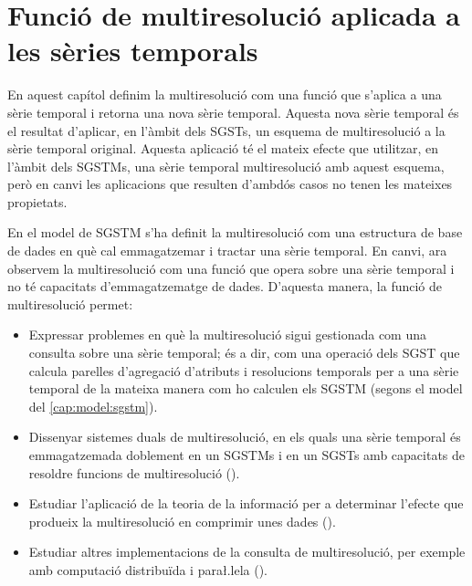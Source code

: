 
\chapter{Funció de multiresolució aplicada a les sèries temporals}
\label{cap:funciomultiresolucio}


En aquest capítol definim la multiresolució com una funció que
s'aplica a una sèrie temporal i retorna una nova sèrie temporal.
Aquesta nova sèrie temporal és el resultat d'aplicar, en l'àmbit dels
\glspl{SGST}, un esquema de multiresolució a la sèrie temporal
original. Aquesta aplicació té el mateix efecte que utilitzar, en
l'àmbit dels \glspl{SGSTM}, una sèrie temporal multiresolució amb
aquest esquema, però en canvi les aplicacions que resulten d'ambdós
casos no tenen les mateixes propietats.

En el model de \gls{SGSTM} s'ha definit la
multiresolució com una estructura de base de dades en què cal
emmagatzemar i tractar una sèrie temporal. En canvi, ara observem la
multiresolució com una funció que opera sobre una sèrie
temporal i no té capacitats d'emmagatzematge de dades.  D'aquesta
manera, la funció de multiresolució permet:
\begin{itemize}

\item Expressar problemes en què la multiresolució sigui gestionada
  com una consulta sobre una sèrie temporal; és a dir, com una
  operació dels \gls{SGST} que calcula parelles d'agregació d'atributs
  i resolucions temporals per a una sèrie temporal de la mateixa
  manera com ho calculen els \gls{SGSTM} (segons el model del
  \autoref{cap:model:sgstm}).

\item Dissenyar sistemes duals de multiresolució, en els quals una
  sèrie temporal és emmagatzemada doblement en un \glspl{SGSTM} i en
  un \glspl{SGST} amb capacitats de resoldre funcions de
  multiresolució ().

\item Estudiar l'aplicació de la teoria de la informació per a
  determinar l'efecte que produeix la multiresolució en comprimir unes
  dades ().

\item Estudiar altres implementacions de la consulta de
  multiresolució, per exemple amb computació distribuïda i para\l.lela
  ().

\end{itemize}




